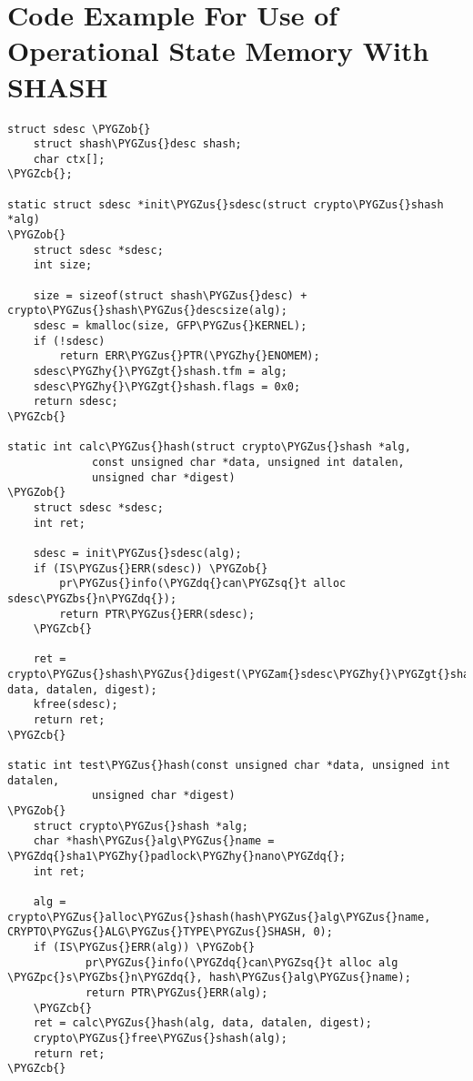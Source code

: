 \documentclass[a4paper,8pt,english]{sphinxmanual}
\def\PYGZbs{\char`\\}
\def\PYGZus{\char`\_}
\def\PYGZob{\char`\{}
\def\PYGZcb{\char`\}}
\def\PYGZam{\char`\&}
\def\PYGZgt{\char`\>}
\def\PYGZpc{\char`\%}
\def\PYGZhy{\char`\-}
\def\PYGZsq{\char`\'}
\def\PYGZdq{\char`\"}
\renewcommand\PYGZsq{\textquotesingle}
\begin{document}
\section{Code Example For Use of Operational State Memory With SHASH}
\label{crypto/api-samples:code-example-for-use-of-operational-state-memory-with-shash}
\begin{Verbatim}[commandchars=\\\{\}]
struct sdesc \PYGZob{}
    struct shash\PYGZus{}desc shash;
    char ctx[];
\PYGZcb{};

static struct sdesc *init\PYGZus{}sdesc(struct crypto\PYGZus{}shash *alg)
\PYGZob{}
    struct sdesc *sdesc;
    int size;

    size = sizeof(struct shash\PYGZus{}desc) + crypto\PYGZus{}shash\PYGZus{}descsize(alg);
    sdesc = kmalloc(size, GFP\PYGZus{}KERNEL);
    if (!sdesc)
        return ERR\PYGZus{}PTR(\PYGZhy{}ENOMEM);
    sdesc\PYGZhy{}\PYGZgt{}shash.tfm = alg;
    sdesc\PYGZhy{}\PYGZgt{}shash.flags = 0x0;
    return sdesc;
\PYGZcb{}

static int calc\PYGZus{}hash(struct crypto\PYGZus{}shash *alg,
             const unsigned char *data, unsigned int datalen,
             unsigned char *digest)
\PYGZob{}
    struct sdesc *sdesc;
    int ret;

    sdesc = init\PYGZus{}sdesc(alg);
    if (IS\PYGZus{}ERR(sdesc)) \PYGZob{}
        pr\PYGZus{}info(\PYGZdq{}can\PYGZsq{}t alloc sdesc\PYGZbs{}n\PYGZdq{});
        return PTR\PYGZus{}ERR(sdesc);
    \PYGZcb{}

    ret = crypto\PYGZus{}shash\PYGZus{}digest(\PYGZam{}sdesc\PYGZhy{}\PYGZgt{}shash, data, datalen, digest);
    kfree(sdesc);
    return ret;
\PYGZcb{}

static int test\PYGZus{}hash(const unsigned char *data, unsigned int datalen,
             unsigned char *digest)
\PYGZob{}
    struct crypto\PYGZus{}shash *alg;
    char *hash\PYGZus{}alg\PYGZus{}name = \PYGZdq{}sha1\PYGZhy{}padlock\PYGZhy{}nano\PYGZdq{};
    int ret;

    alg = crypto\PYGZus{}alloc\PYGZus{}shash(hash\PYGZus{}alg\PYGZus{}name, CRYPTO\PYGZus{}ALG\PYGZus{}TYPE\PYGZus{}SHASH, 0);
    if (IS\PYGZus{}ERR(alg)) \PYGZob{}
            pr\PYGZus{}info(\PYGZdq{}can\PYGZsq{}t alloc alg \PYGZpc{}s\PYGZbs{}n\PYGZdq{}, hash\PYGZus{}alg\PYGZus{}name);
            return PTR\PYGZus{}ERR(alg);
    \PYGZcb{}
    ret = calc\PYGZus{}hash(alg, data, datalen, digest);
    crypto\PYGZus{}free\PYGZus{}shash(alg);
    return ret;
\PYGZcb{}
\end{Verbatim}
\end{document}
